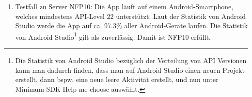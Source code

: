 \begin{enumerate}[label=\textbf{/T\arabic*0/}, align=left]
	\item Testfall zu Server NFP10: Die App läuft auf einem \Gls{Android}-\Gls{Smartphone}, welches mindestens \Gls{API-Level} 22 unterstützt. Laut der Statistik von Android Studio werde die App auf ca. 97.3\% aller \Gls{Android}-Geräte laufen. Die Statistik von Android Studio\footnote{Die Statistik von Android Studio bezüglich der Verteilung von \Gls{API} Versionen kann man dadurch finden, dass man auf Android Studio einen neuen Projekt erstellt, dann bspw. eine neue leere Aktivität erstellt, und nun unter Minimum SDK \dq Help me choose\dq{} auswählt.} gilt als zuverlässig. Damit ist NFP10 erfüllt.
\end{enumerate}